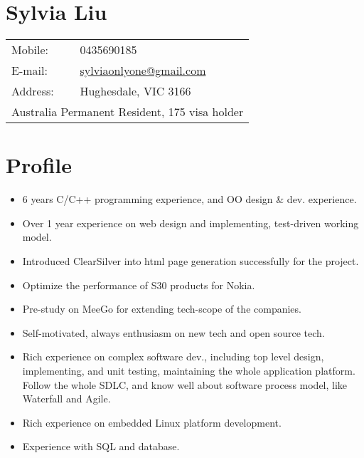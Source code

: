 \documentclass[a4paper,11pt]{article}
\begin{document}

\section*{Sylvia Liu}
\begin{tabular}{l l}
Mobile:  & 0435690185 \\
E-mail:  & \href{mailto:sylviaonlyone@gmail.com}{sylviaonlyone@gmail.com} \\
Address: & Hughesdale, VIC 3166 \\
\multicolumn{2}{l}{Australia Permanent Resident, 175 visa holder} \\
\end{tabular}

\section*{Profile}
\begin{itemize}
\item 6 years C/C++ programming experience, and OO design \& dev. experience.
\item Over 1 year experience on web design and implementing, test-driven working model.
\item Introduced ClearSilver into html page generation successfully for the project.
\item Optimize the performance of S30 products for Nokia.
\item Pre-study on MeeGo for extending tech-scope of the companies.
\item Self-motivated, always enthusiasm on new tech and open source tech.
\item Rich experience on complex software dev., including top level design, implementing, and unit testing, maintaining the whole application platform. Follow the whole SDLC, and know well about software process model, like Waterfall and Agile.
\item Rich experience on embedded Linux platform development.
\item Experience with SQL and database.
\end{itemize}

\end{document}
